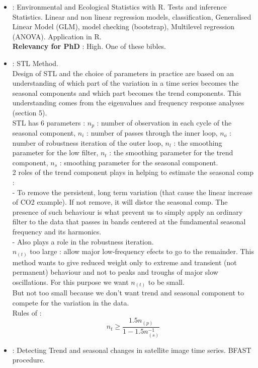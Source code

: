 \documentclass[]{report}
\begin{document}
\begin{itemize}
	\item \cite{qian2016environmental} : Environmental and Ecological Statistics with R. Tests and inference Statistics. Linear and non linear regression models, classification, Generalised Linear Model (GLM), model checking (bootstrap), Multilevel regression (ANOVA). Application in R.
	\\\textbf{Relevancy for PhD} : High. One of these bibles.
	\item \cite{cleveland1990stl} : STL Method.
	\\ Design of STL and the choice of parameters in practice are based on an understanding of which part of the variation in a time series becomes the seasonal components and which part becomes the trend components. This understanding comes from the eigenvalues and frequency response analyses (section 5).
	\\ STL has 6 parameters : $n_p$ : number of observation in each cycle of the seasonal component, $n_i$ : number of passes through the inner loop, $n_o$ : number of robustness iteration of the outer loop, $n_l$ : the smoothing parameter for the low filter, $n_t$ : the smoothing parameter for the trend component, $n_s$ : smoothing parameter for the seasonal component.
	\\ 2 roles of the trend component plays in helping to estimate the seasonal comp :
	\\- To remove the persistent, long term variation (that cause the linear increase of CO2 example). If not remove, it will distor the seasonal comp. The presence of such behaviour is what prevent us to simply apply an ordinary filter to the data that passes in bands centered at the fundamental seasonal frequency and its harmonics.
	\\- Also plays a role in the robustness iteration.
	\\ $n_{(t)}$ too large : allow major low-frequency efects to go to the remainder. This method wants to give reduced weight only to extreme and transient (not permanent) behaviour and not to peaks and troughs of major slow oscillations. For this purpose we want $n_{(t)}$ to be small.
	\\ But not too small because we don't want trend and seasonal component to compete for the variation in the data.
	\\ Rules of :
\begin{equation}
	\label{eqSTL}
n_t \geqslant \frac{1.5n_{(p)}}{1-1.5n_{(s)}^{-1}}
\end{equation}
	\item \cite{verbesselt2010detecting} : Detecting Trend and seasonal changes in satellite image time series. BFAST procedure.

\end{itemize}
\end{document}

